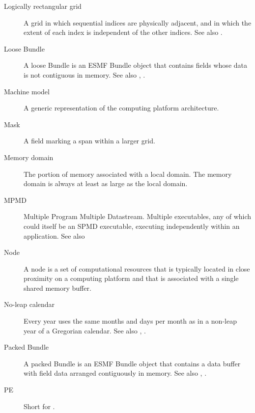 \begin{description}
\item[Logically rectangular grid] \label{glos:RecGrid} A grid in 
  which sequential indices are physically adjacent, and in which the 
  extent of each index is independent of the other indices.
  See also .

\item[Loose Bundle] \label{glos:LooseBundle} A loose Bundle 
  is an ESMF Bundle object that contains fields whose data is 
  not contiguous in memory.  See also ,
  .

\item[Machine model] A generic representation of the computing 
  platform architecture.

\item[Mask] \label{glos:Mask} A field marking a span within a larger grid.

\item[Memory domain] \label{glos:MemDomain} The portion of memory 
  associated with a local domain.  The memory domain is always at least 
  as large as the local domain.

\item[MPMD] \label{glos:MPMD} Multiple Program Multiple Datastream.
  Multiple executables, any of which could itself be an SPMD
  executable, executing independently within an application. 
  See also 

\item[Node] \label{glos:Node} A node is a set of computational resources
  that is typically located in close proximity on a computing platform
  and that is associated with a single shared memory buffer.

\item [No-leap calendar] \label{glos:NoLeap} Every year uses the same months 
  and days per month as in a non-leap year of a Gregorian calendar.  See
  also , .

\item[Packed Bundle] \label{glos:PackedBundle} A packed Bundle is an 
  ESMF Bundle object that contains
  a data buffer with field data arranged contiguously in memory. See 
  also , .

\item[PE] \label{glos:PE} Short for .


\end{description}
